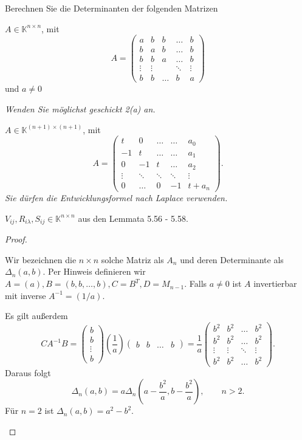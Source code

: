 \begin{Problem}
	Berechnen Sie die Determinanten der folgenden Matrizen
	\begin{parts}
	\item $A\in \mathbb{K}^{n\times n}$, mit
		\[
			A=\begin{pmatrix}  a & b & b & \dots & b \\ b & a & b & \dots & b \\ b & b & a & \dots & b \\ \vdots & \vdots & & \ddots & \vdots \\ b & b & \dots & b & a \end{pmatrix} 
		\] 
		und $a\neq 0$ 

		{\footnotesize\emph{Wenden Sie m\"{o}glichst geschickt 2(a) an.}}
		\item $A\in \mathbb{K}^{(n+1)\times (n+1)}$, mit
			\[
				A=\begin{pmatrix} t & 0 & \dots & \dots & a_0 \\ -1 & t & \dots & \dots & a_1 \\ 0 & -1 & t & \dots & a_2 \\ \vdots & \ddots & \ddots & \ddots & \vdots \\ 0 & \dots & 0 & -1 & t+a_n \end{pmatrix} 
			.\] 
			{\footnotesize\emph{Sie dürfen die Entwicklungsformel nach Laplace verwenden.}}
		\item $V_{ij}, R_{i\lambda}, S_{ij}\in \mathbb{K}^{n\times n}$ aus den Lemmata 5.56 - 5.58.
	\end{parts}
\end{Problem}
\begin{proof}
	\begin{parts}
	\item Wir bezeichnen die $n\times n$ solche Matriz als $A_n$ und deren Determinante als $\Delta_n(a,b)$. Per Hinweis definieren wir $A=(a), B=(b,b,\dots, b), C=B^T, D=M_{n-1}$. Falls $a\neq 0$ ist $A$ invertierbar mit inverse $A^{-1}=(1 / a)$.

		Es gilt außerdem
		\[
			CA^{-1}B=\begin{pmatrix} b \\ b \\ \vdots \\ b \end{pmatrix} \left( \frac{1}{a} \right) \begin{pmatrix} b & b & \dots & b \end{pmatrix}  =\frac{1}{a}\begin{pmatrix} b^2 & b^2 & \dots & b^2 \\ b^2 & b^2 & \dots & b^2 \\ \vdots & \vdots & \ddots & \vdots \\ b^2 & b^2 & \dots & b^2 \end{pmatrix} 
		.\] 
		Daraus folgt
		\[
		\Delta_n(a,b)=a\Delta_n\left( a-\frac{b^2}{a},b-\frac{b^2}{a} \right), \qquad n > 2
		.\] 
		F\"{u}r $n=2$ ist $\Delta_n(a,b)=a^2-b^2$.
	\end{parts}
\end{proof}
